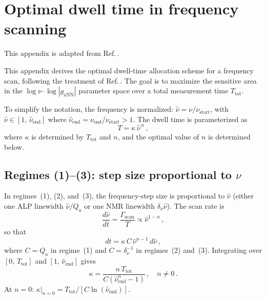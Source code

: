 \chapter{Optimal dwell time in frequency scanning}\label{app:dwell_time}
\begin{jointwork}
    This appendix is adapted from Ref.\,\cite{Yuzhe2023_FrequencyScanning}.
\end{jointwork}

This appendix derives the optimal dwell-time allocation scheme for a frequency scan, following the treatment of Ref.\,\cite{Yuzhe2023_FrequencyScanning}.
The goal is to maximize the sensitive area in the $\log\nu$--$\log|g_{\mathrm{aNN}}|$ parameter space over a total measurement time $T_{\mathrm{tot}}$.

To simplify the notation, the frequency is normalized: $\hat{\nu} = \nu/\nu_{\mathrm{start}}$, with $\hat{\nu} \in [1,\,\hat{\nu}_{\mathrm{end}}]$ where $\hat{\nu}_{\mathrm{end}} = \nu_{\mathrm{end}}/\nu_{\mathrm{start}} > 1$.
The dwell time is parameterized as
\begin{equation}
    T = \kappa\,\hat{\nu}^{\,n}
    \,,\label{eq:T_kappa_n}
\end{equation}
where $\kappa$ is determined by $T_{\mathrm{tot}}$ and $n$, and the optimal value of $n$ is determined below.

\section*{Regimes (1)--(3): step size proportional to $\nu$}

In regimes~(1), (2), and~(3), the frequency-step size is proportional to $\hat{\nu}$ (either one ALP linewidth $\hat{\nu}/Q_a$ or one NMR linewidth $\delta_\nu\hat{\nu}$).
The scan rate is
\begin{equation}
    \dfrac{d\hat{\nu}}{dt} = \dfrac{\Gamma_{\mathrm{scan}}}{T} \propto \hat{\nu}^{1-n}
    \,,
\end{equation}
so that
\begin{equation}
    dt = \kappa\,C\,\hat{\nu}^{n-1}\,d\hat{\nu}
    \,,
\end{equation}
where $C = Q_a$ in regime~(1) and $C = \delta_\nu^{-1}$ in regimes~(2) and~(3).
Integrating over $[0,\,T_{\mathrm{tot}}]$ and $[1,\,\hat{\nu}_{\mathrm{end}}]$ gives
\begin{equation}
    \kappa = \dfrac{n\,T_{\mathrm{tot}}}{C(\hat{\nu}_{\mathrm{end}}^{n}-1)}
    \,,\quad n \ne 0\,.
\end{equation}
At $n=0$: $\kappa|_{n=0} = T_{\mathrm{tot}}/[C\ln(\hat{\nu}_{\mathrm{end}})]$.

